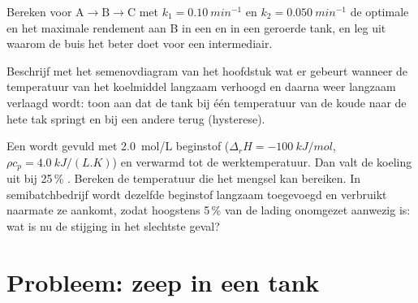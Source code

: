 \begin{exercise}[$\star\star\star$]\label{exo:b2:continuous-reactors:10}
Bereken voor $\mathrm A \to \mathrm B \to \mathrm C$ met $k_1 = \qty{0.10}{min^{-1}}$
en $k_2 = \qty{0.050}{min^{-1}}$ de optimale  en het
maximale rendement aan B in een  en in een geroerde tank, en leg uit
waarom de buis het beter doet voor een intermediair.
\end{exercise}

\begin{exercise}[$\star\star\star$]\label{exo:b2:continuous-reactors:11}
Beschrijf met het semenovdiagram van het hoofdstuk wat er gebeurt wanneer de
temperatuur van het koelmiddel langzaam verhoogd en daarna weer langzaam verlaagd wordt: toon aan dat
de tank bij één temperatuur van de koude naar de hete tak springt en bij een
andere terug (hysterese).
\end{exercise}

\begin{exercise}[$\star\star\star$]\label{exo:b2:continuous-reactors:12}
Een  wordt gevuld met \qty{2.0}{mol/L} beginstof ($\Delta_r H =
\qty{-100}{kJ/mol}$, $\rho c_p = \qty{4.0}{kJ/(L.K)}$) en verwarmd tot de
werktemperatuur. Dan valt de koeling uit bij 25\,\% . Bereken de
temperatuur die het mengsel kan bereiken. In semibatchbedrijf wordt dezelfde
beginstof langzaam toegevoegd en verbruikt naarmate ze aankomt, zodat hoogstens 5\,\%
van de lading onomgezet aanwezig is: wat is nu de stijging in het slechtste geval?
\end{exercise}

\section{Probleem: zeep in een tank}

